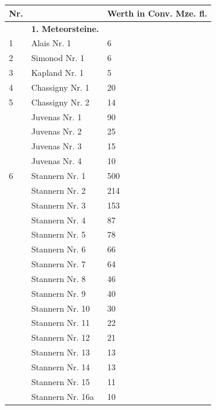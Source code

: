 \documentclass[a4paper, 11pt, oneside, polutonikogreek, german]{article}
\begin{document}
\section{}
\begin{center}
    \footnotesize
    \begin{longtable}{|l|l|l|}
    \hline
        Nr. &   & Werth in Conv. Mze. fl. \\ \hline
          & \textbf{1. Meteorsteine.} &   \\ \hline
        1 & Alais Nr. 1 & 6 \\ \hline
        2 & Simonod Nr. 1 & 6 \\ \hline
        3 & Kapland Nr. 1 & 5 \\ \hline
        4 & Chassigny Nr. 1 & 20 \\ \hline
        5 & Chassigny Nr. 2 & 14 \\ \hline
          & Juvenas Nr. 1 & 90 \\ \hline
          & Juvenas Nr. 2 & 25 \\ \hline
          & Juvenas Nr. 3 & 15 \\ \hline
          & Juvenas Nr. 4 & 10 \\ \hline
        6 & Stannern Nr. 1 & 500 \\ \hline
          & Stannern Nr. 2 & 214 \\ \hline
          & Stannern Nr. 3 & 153 \\ \hline
          & Stannern Nr. 4 & 87 \\ \hline
          & Stannern Nr. 5 & 78 \\ \hline
          & Stannern Nr. 6 & 66 \\ \hline
          & Stannern Nr. 7 & 64 \\ \hline
          & Stannern Nr. 8 & 46 \\ \hline
          & Stannern Nr. 9 & 40 \\ \hline
          & Stannern Nr. 10 & 30 \\ \hline
          & Stannern Nr. 11 & 22 \\ \hline
          & Stannern Nr. 12 & 21 \\ \hline
          & Stannern Nr. 13 & 13 \\ \hline
          & Stannern Nr. 14 & 13 \\ \hline
          & Stannern Nr. 15 & 11 \\ \hline
          & Stannern Nr. 16a & 10 \\ \hline

\end{longtable}
\end{center}
\end{document}
